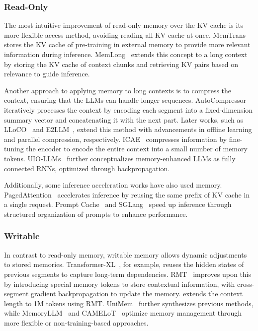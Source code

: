 \subsubsection{Read-Only}\label{sec4_1}

The most intuitive improvement of read-only memory over the KV cache is its more flexible access method, avoiding reading all KV cache at once. MemTrans~\citep{wu2022memorizing} stores the KV cache of pre-training in external memory to provide more relevant information during inference. MemLong~\citep{liu2024memlong} extends this concept to a long context by storing the KV cache of context chunks and retrieving KV pairs based on relevance to guide inference.

Another approach to applying memory to long contexts is to compress the context, ensuring that the LLMs can handle longer sequences. AutoCompressor~\citep{chevalier2023adapting} iteratively processes the context by encoding each segment into a fixed-dimension summary vector and concatenating it with the next part. Later works, such as LLoCO~\citep{tan2024lloco} and E2LLM~\citep{liao2024e2llm}, extend this method with advancements in offline learning and parallel compression, respectively. ICAE~\citep{ge2023context} compresses information by fine-tuning the encoder to encode the entire context into a small number of memory tokens. UIO-LLMs~\citep{li2024uio} further conceptualizes memory-enhanced LLMs as fully connected RNNs, optimized through backpropagation.

\label{prefix_sharing}Additionally, some inference acceleration works have also used memory. PagedAttention~\citep{kwon2023efficient} accelerates inference by reusing the same prefix of KV cache in a single request. Prompt Cache~\citep{gim2024prompt} and SGLang~\citep{zheng2024sglang} speed up inference through structured organization of prompts to enhance performance.

\subsubsection{Writable}\label{sec4_2}

In contrast to read-only memory, writable memory allows dynamic adjustments to stored memories. Transformer-XL~\citep{dai2019transformer}, for example, reuses the hidden states of previous segments to capture long-term dependencies. RMT~\citep{bulatov2022recurrent} improves upon this by introducing special memory tokens to store contextual information, with cross-segment gradient backpropagation to update the memory. \citet{bulatov2023scaling} extends the context length to 1M tokens using RMT. UniMem~\citep{fang2024unimem} further synthesizes previous methods, while MemoryLLM~\citep{wang2024memoryllm} and CAMELoT~\citep{he2024camelot} optimize memory management through more flexible or non-training-based approaches.

